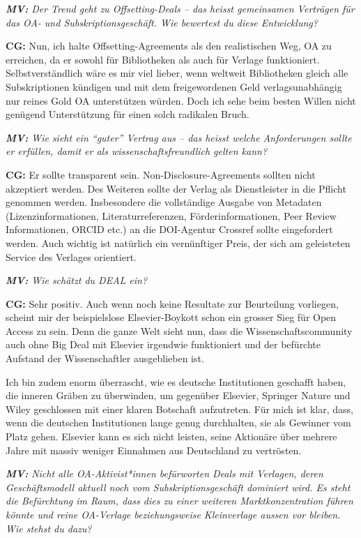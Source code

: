 \documentclass[a4paper,
fontsize=11pt,
oneside,
numbers=noperiodatend,
parskip=half-,
bibliography=totoc,
final
]{scrartcl}
\begin{document}
\emph{\textbf{MV:} Der Trend geht zu Offsetting-Deals -- das heisst
gemeinsamen Verträgen für das OA- und Subskriptionsgeschäft. Wie
bewertest du diese Entwicklung?}

\textbf{CG:} Nun, ich halte Offsetting-Agreements als den realistischen
Weg, OA zu erreichen, da er sowohl für Bibliotheken als auch für Verlage
funktioniert. Selbstverständlich wäre es mir viel lieber, wenn weltweit
Bibliotheken gleich alle Subskriptionen kündigen und mit dem
freigewordenen Geld verlagsunabhängig nur reines Gold OA unterstützen
würden. Doch ich sehe beim besten Willen nicht genügend Unterstützung
für einen solch radikalen Bruch.

\emph{\textbf{MV:} Wie sieht ein \enquote{guter} Vertrag aus -- das
heisst welche Anforderungen sollte er erfüllen, damit er als
wissenschaftsfreundlich gelten kann?}

\textbf{CG:} Er sollte transparent sein. Non-Disclosure-Agreements
sollten nicht akzeptiert werden. Des Weiteren sollte der Verlag als
Dienstleister in die Pflicht genommen werden. Insbesondere die
vollständige Ausgabe von Metadaten (Lizenzinformationen,
Literaturreferenzen, Förderinformationen, Peer Review Informationen,
ORCID etc.) an die DOI-Agentur Crossref sollte eingefordert werden. Auch
wichtig ist natürlich ein vernünftiger Preis, der sich am geleisteten
Service des Verlages orientiert.

\emph{\textbf{MV:} Wie schätzt du DEAL ein?}

\textbf{CG:} Sehr positiv. Auch wenn noch keine Resultate zur
Beurteilung vorliegen, scheint mir der beispielslose Elsevier-Boykott
schon ein grosser Sieg für Open Access zu sein. Denn die ganze Welt
sieht nun, dass die Wissenschaftscommunity auch ohne Big Deal mit
Elsevier irgendwie funktioniert und der befürchte Aufstand der
Wissenschaftler ausgeblieben ist.

Ich bin zudem enorm überrascht, wie es deutsche Institutionen geschafft
haben, die inneren Gräben zu überwinden, um gegenüber Elsevier, Springer
Nature und Wiley geschlossen mit einer klaren Botschaft aufzutreten. Für
mich ist klar, dass, wenn die deutschen Institutionen lange genug
durchhalten, sie als Gewinner vom Platz gehen. Elsevier kann es sich
nicht leisten, seine Aktionäre über mehrere Jahre mit massiv weniger
Einnahmen aus Deutschland zu vertrösten.

\emph{\textbf{MV:} Nicht alle OA-Aktivist*innen befürworten Deals mit
Verlagen, deren Geschäftsmodell aktuell noch vom Subskriptionsgeschäft
dominiert wird. Es steht die Befürchtung im Raum, dass dies zu einer
weiteren Marktkonzentration führen könnte und reine OA-Verlage
beziehungsweise Kleinverlage aussen vor bleiben. Wie stehst du dazu?}
\end{document}
